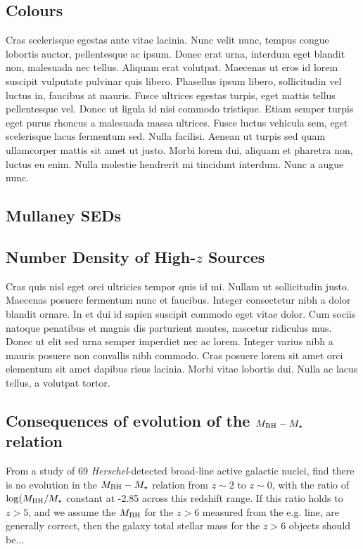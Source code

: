 \documentclass[usenatbib]{mnras}
\begin{document}
\subsection{Colours}
Cras scelerisque egestas ante vitae lacinia. Nunc velit nunc, tempus
congue lobortis auctor, pellentesque ac ipsum. Donec erat urna,
interdum eget blandit non, malesuada nec tellus. Aliquam erat
volutpat. Maecenas ut eros id lorem suscipit vulputate pulvinar quis
libero. Phasellus ipsum libero, sollicitudin vel luctus in, faucibus
at mauris. Fusce ultrices egestas turpis, eget mattis tellus
pellentesque vel. Donec ut ligula id nisi commodo tristique. Etiam
semper turpis eget purus rhoncus a malesuada massa ultrices. Fusce
luctus vehicula sem, eget scelerisque lacus fermentum sed. Nulla
facilisi. Aenean ut turpis sed quam ullamcorper mattis sit amet ut
justo. Morbi lorem dui, aliquam et pharetra non, luctus eu enim. Nulla
molestie hendrerit mi tincidunt interdum. Nunc a augue nunc.

\subsection{Mullaney SEDs}

\subsection{Number Density of High-$z$ Sources}
Cras quis nisl eget orci ultricies tempor quis id mi. Nullam ut
sollicitudin justo. Maecenas posuere fermentum nunc et
faucibus. Integer consectetur nibh a dolor blandit ornare. In et dui
id sapien suscipit commodo eget vitae dolor. Cum sociis natoque
penatibus et magnis dis parturient montes, nascetur ridiculus
mus. Donec ut elit sed urna semper imperdiet nec ac lorem. Integer
varius nibh a mauris posuere non convallis nibh commodo. Cras posuere
lorem sit amet orci elementum sit amet dapibus risus lacinia. Morbi
vitae lobortis dui. Nulla ac lacus tellus, a volutpat tortor.

\subsection{Consequences of evolution of the $M_{\rm BH} - M_{\star}$ relation}
From a study of 69 {\it Herschel}-detected broad-line active galactic nuclei, 
\citet{Sun2015} find there is no evolution in the $M_{\rm BH} - M_{\star}$ relation 
from $z\sim2$ to $z\sim0$, with the ratio of $\log (M_{\rm BH} / M_{\star}$ constant
at -2.85 across this redshift range. If this ratio holds to $z>5$, and we assume the 
$M_{\rm BH}$ for the $z>6$ measured from the e.g. \mgii line, are generally correct, 
then the galaxy total stellar mass for the $z>6$ objects should be...
\end{document}
